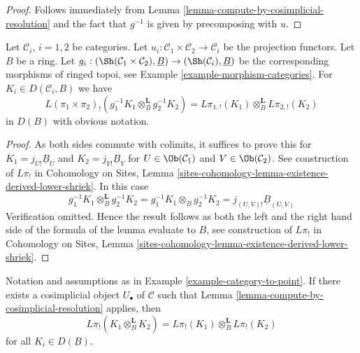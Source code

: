 \begin{proof}
Follows immediately from
Lemma \ref{lemma-compute-by-cosimplicial-resolution}
and the fact that $g^{-1}$ is given by precomposing with $u$.
\end{proof}

\begin{lemma}
\label{lemma-product-categories}
Let $\mathcal{C}_i$, $i = 1, 2$ be categories. Let
$u_i : \mathcal{C}_1 \times \mathcal{C}_2 \to \mathcal{C}_i$ be the
projection functors. Let $B$ be a ring. Let
$g_i : (\Sh(\mathcal{C}_1 \times \mathcal{C}_2), \underline{B}) \to
(\Sh(\mathcal{C}_i), \underline{B})$ be the corresponding morphisms
of ringed topoi, see Example \ref{example-morphism-categories}. For
$K_i \in D(\mathcal{C}_i, B)$ we have
$$
L(\pi_1 \times \pi_2)_!(
g_1^{-1}K_1 \otimes_{\underline{B}}^\mathbf{L} g_2^{-1}K_2)
=
L\pi_{1, !}(K_1) \otimes_B^\mathbf{L} L\pi_{2, !}(K_2)
$$
in $D(B)$ with obvious notation.
\end{lemma}

\begin{proof}
As both sides commute with colimits, it suffices to prove this for
$K_1 = j_{U!}\underline{B}_U$ and $K_2 = j_{V!}\underline{B}_V$
for $U \in \Ob(\mathcal{C}_1)$ and $V \in \Ob(\mathcal{C}_2)$.
See construction of $L\pi_!$ in Cohomology on Sites, Lemma
\ref{sites-cohomology-lemma-existence-derived-lower-shriek}.
In this case
$$
g_1^{-1}K_1 \otimes_{\underline{B}}^\mathbf{L} g_2^{-1}K_2 =
g_1^{-1}K_1 \otimes_{\underline{B}} g_2^{-1}K_2 =
j_{(U, V)!}\underline{B}_{(U, V)}
$$
Verification omitted. Hence the result follows as both the left and
the right hand side of the formula of the lemma evaluate to $B$, see
construction of $L\pi_!$ in
Cohomology on Sites, Lemma
\ref{sites-cohomology-lemma-existence-derived-lower-shriek}.
\end{proof}

\begin{lemma}
\label{lemma-eilenberg-zilber}
Notation and assumptions as in Example \ref{example-category-to-point}.
If there exists a cosimplicial object $U_\bullet$ of $\mathcal{C}$
such that Lemma \ref{lemma-compute-by-cosimplicial-resolution}
applies, then
$$
L\pi_!(K_1 \otimes^\mathbf{L}_{\underline{B}} K_2) =
L\pi_!(K_1) \otimes^\mathbf{L}_B L\pi_!(K_2)
$$
for all $K_i \in D(\underline{B})$.
\end{lemma}

